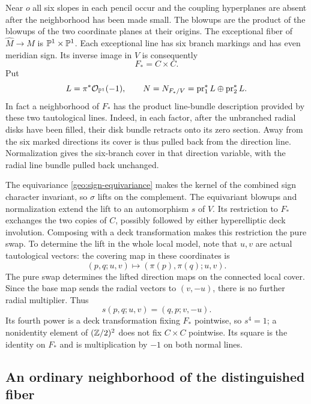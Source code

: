 Near $o$ all six slopes in each pencil occur and the coupling
hyperplanes are absent after the neighborhood has been made small.
The blowups are the product of the blowups of the two coordinate
planes at their origins.  The exceptional fiber of $\widehat M\to M$
is $\mathbb P^1\times\mathbb P^1$.  Each exceptional line has six branch markings
and has even meridian sign.  Its inverse image in $V$ is consequently
\begin{equation}\label{geo:Fstar}
                            F_*=C\times C.
\end{equation}
Put
\[
       L=\pi^*\mathcal O_{\mathbb P^1}(-1),
       \qquad N=N_{F_*/V}
          =\operatorname{pr}_1^*L\oplus\operatorname{pr}_2^*L.
\]
In fact a neighborhood of $F_*$ has the product line-bundle description
provided by these two tautological lines.  Indeed, in each factor, after
the unbranched radial disks have been filled, their disk bundle retracts onto its
zero section.  Away from the six marked directions its cover is thus
pulled back from the direction line.  Normalization gives the
six-branch cover in that direction variable, with the radial line
bundle pulled back unchanged.

The equivariance \eqref{geo:sign-equivariance} makes the kernel of the
combined sign character invariant, so $\sigma$ lifts on the complement.
The equivariant blowups and normalization extend the lift to an
automorphism $s$ of $V$.  Its restriction to $F_*$ exchanges the two
copies of $C$, possibly followed by either hyperelliptic deck
involution.  Composing with a deck transformation makes this
restriction the pure swap.  To determine the lift in the whole local
model, note that $u,v$ are actual tautological vectors: the covering
map in these coordinates is
\[
 (p,q;u,v)\longmapsto(\pi(p),\pi(q);u,v).
\]
The pure swap determines the lifted direction maps on the connected
local cover.  Since the base map sends the radial vectors to $(v,-u)$,
there is no further radial multiplier.  Thus
\begin{equation}\label{geo:line-action}
             s(p,q;u,v)=(q,p;v,-u).
\end{equation}
Its fourth power is a deck transformation fixing $F_*$ pointwise,
so $s^4=1$; a nonidentity element of $(\mathbb Z/2)^2$ does not fix $C\times C$
pointwise.  Its square is the identity on $F_*$ and is multiplication
by $-1$ on both normal lines.

\subsection{An ordinary neighborhood of the distinguished fiber}
\label{geo:resolution}

